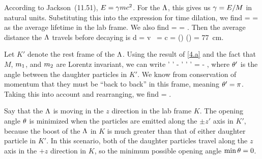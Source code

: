 \begin{solution}
	According to Jackson~(11.51), $E = \gamma m c^2$.  For the $\Lambda$, this gives us $\gamma = E / M$ in natural units.  Substituting this into the expression for time dilation, we find
	\beq
		\Delt = \gam \tau
		=  \tau
	\eeq
	as the average lifetime in the lab frame.  We also find
	\beq
		\bet = 
		= .
	\eeq
	Then the average distance the $\Lambda$ travels before decaying is
	\beq
		d = v \,\Delt
		= c \tau {} 
		= (\lspeed)  \frac{\ELam}{\mLam} (\tauLam)
		= {\color{blue} \SI{77}{\cm}}.
	\eeq
	
	Let $K'$ denote the rest frame of the $\Lambda$.  Using the result of \ref{4.a} and the fact that $M$, $m_1$, and $m_2$ are Lorentz invariant, we can write
	\beqn \label{thing4}
		\Eq' \Ew' - \pq' \pw' \cos\tht' = \Eq \Ew - \pq \pw \cos\tht,
	\eeqn
	where $\theta'$ is the angle between the daughter particles in $K'$.  We know from conservation of momentum that they must be ``back to back'' in this frame, meaning $\theta' = \pi$.  Taking this into account and rearranging, we find
	\beqn \label{thing4.2}
		\cos\tht = .
	\eeqn

	Say that the $\Lambda$ is moving in the $z$ direction in the lab frame $K$.  The opening angle $\theta$ is minimized when the particles are emitted along the $\pm z'$ axis in $K'$, because the boost of the $\Lambda$ in $K$ is much greater than that of either daughter particle in $K'$.  In this scenario, both of the daughter particles travel along the $z$ axis in the $+z$ direction in $K$, so the minimum possible opening angle $\min\theta = 0$.
	

\end{solution}

